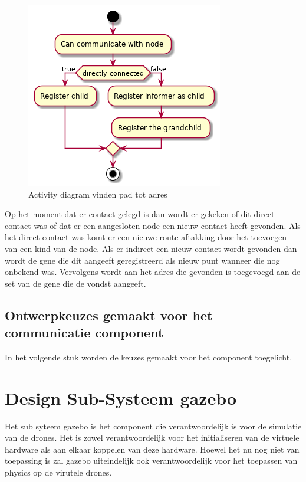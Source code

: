 \documentclass[a4paper, 11pt, oneside]{report}
\begin{document}
\begin{figure}[H]
	\begin{center}\includegraphics[width=.45\linewidth]{UML/out/Communication/activity/contactgevonden/contactgevonden.png}\end{center}
	\caption{Activity diagram vinden pad tot adres}
	\label{fig:communication:routeringtechniek:gevonde}
\end{figure}

Op het moment dat er contact gelegd is dan wordt er gekeken of dit direct contact was of dat er een aangesloten node een nieuw contact heeft gevonden. Als het direct contact was komt er een nieuwe route aftakking door het toevoegen van een kind van de node.
Als er indirect een nieuw contact wordt gevonden dan wordt de gene die dit aangeeft geregistreerd als nieuw punt wanneer die nog onbekend was. Vervolgens wordt aan het adres die gevonden is toegevoegd aan de set van de gene die de vondst aangeeft.

\subsection{Ontwerpkeuzes gemaakt voor het communicatie component}
\label{DetailedDesign:Communicatie:ontwerkeuzes}
In het volgende stuk worden de keuzes gemaakt voor het component toegelicht.


\section{Design Sub-Systeem gazebo}
\label{DetailedDesign:MeshNetwerk}
Het sub syteem gazebo is het component die verantwoordelijk is voor de simulatie van de drones. 
Het is zowel verantwoordelijk voor het initialiseren van de virtuele hardware als aan elkaar koppelen van deze hardware.
Hoewel het nu nog niet van toepassing is zal gazebo uiteindelijk ook verantwoordelijk voor het toepassen van physics op de virutele drones. 
\end{document}
